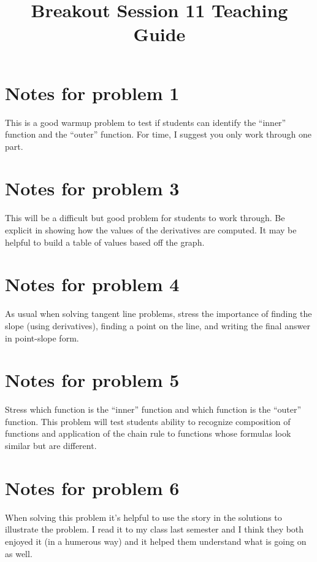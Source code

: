 \documentclass[nooutcomes]{ximera}
\title{Breakout Session 11 Teaching Guide}
\begin{document}
\begin{abstract}

\end{abstract}
\maketitle

\section{Notes for problem 1}
This is a good warmup problem to test if students can identify the
``inner'' function and the ``outer'' function.
For time, I suggest you only work through one part.

\section{Notes for problem 3}
This will be a difficult but good problem for students to work through.
Be explicit in showing how the values of the derivatives are computed.
It may be helpful to build a table of values based off the graph.

\section{Notes for problem 4}
As usual when solving tangent line problems, stress the importance of finding the slope (using derivatives), finding a point on the line, and writing the final answer in point-slope form.

\section{Notes for problem 5}
Stress which function is the ``inner'' function and which function is the ``outer'' function.
This problem will test students ability to recognize composition of functions and application of the chain rule to functions whose formulas look similar but are different.

\section{Notes for problem 6}
When solving this problem it’s helpful to use the story in the solutions to illustrate the problem.
I read it to my class last semester and I think they both enjoyed it (in a humerous way) and it helped them understand what is going on as well.
\end{document}
